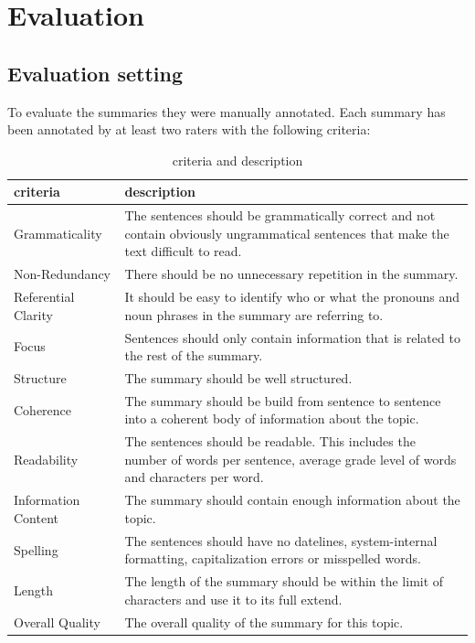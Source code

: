 
\section{Evaluation}
\label{ch:evaluation}

\subsection{Evaluation setting}
To evaluate the summaries they were manually annotated.
Each summary has been annotated by at least two raters with the following criteria:

\begin{table}[H]
	\begin{tabularx}{\textwidth}{l|X} \toprule
		criteria            & description \\ \midrule
		Grammaticality      & The sentences should be grammatically correct and not contain obviously ungrammatical sentences that make the text difficult to read.\\
		Non-Redundancy      & There should be no unnecessary repetition in the summary.\\
		Referential Clarity & It should be easy to identify who or what the pronouns and noun
  phrases in the summary are referring to.\\
		Focus               & Sentences should only contain information that is related to the rest of the summary.\\
		Structure           & The summary should be well structured.\\
		Coherence           & The summary should be build from sentence to sentence into a coherent body of information about the topic.\\
		Readability         & The sentences should be readable. This includes the number of words per sentence, average grade level of words and characters per word. \\
		Information Content & The summary should contain enough information about the topic.\\
		Spelling            & The sentences should have no datelines, system-internal formatting, capitalization errors or misspelled words.\\
		Length              & The length of the summary should be within the limit of characters and use it to its full extend.\\
		Overall Quality     & The overall quality of the summary for this topic.\\  \bottomrule    
	\end{tabularx}
	\caption{criteria and description}
	\label{tab:evacriteria}
\end{table}


